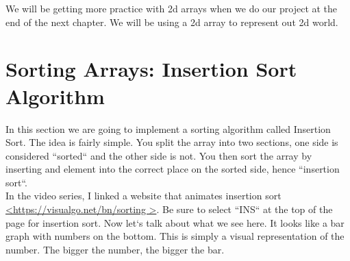 \documentclass[11]{article}
\begin{document}
We will be getting more practice with 2d arrays when we do our project at the end of the next chapter. We will be using a 2d array to represent out 2d world.

\section{Sorting Arrays: Insertion Sort Algorithm}
In this section we are going to implement a sorting algorithm called Insertion Sort. The idea is fairly simple. You split the array into two sections, one side is considered ``sorted`` and the other side is not. You then sort the array by inserting and element into the correct place on the sorted side, hence ``insertion sort``.\\

In the video series, I linked a website that animates insertion sort \url{<https://visualgo.net/bn/sorting
>}. Be sure to select ``INS`` at the top of the page for insertion sort. Now let`s talk about what we see here. It looks like a bar graph with numbers on the bottom. This is simply a visual representation of the number. The bigger the number, the bigger the bar.\\
\end{document}
